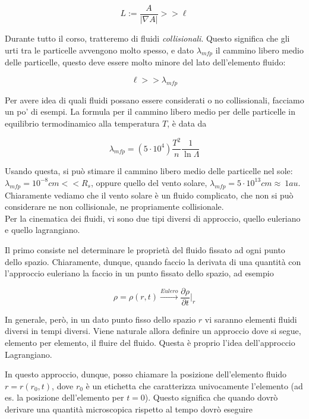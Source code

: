 \documentclass{report}
\begin{document}
\begin{equation}
    L := \frac{A}{|\nabla A|} >> \ell 
\end{equation}

Durante tutto il corso, tratteremo di fluidi \emph{collisionali}. Questo significa che gli urti tra le particelle avvengono molto spesso, e dato $\lambda_{mfp}$ il cammino libero medio delle particelle, questo deve essere molto minore del lato dell'elemento fluido: 

\begin{equation}
    \ell >> \lambda_{mfp}
\end{equation}

Per avere idea di quali fluidi possano essere considerati o no collissionali, facciamo un po' di esempi. La formula per il cammino libero medio per delle particelle in equilibrio termodinamico alla temperatura $T$,  è data da 

\begin{equation}
    \lambda_{mfp} = (5 \cdot 10^4)\frac{T^2}{n}\frac{1}{\ln \Lambda}
\end{equation}

Usando questa, si può stimare il cammino libero medio delle particelle nel sole: $\lambda_{mfp} = 10^{-8}cm << R_s$, oppure quello del vento solare, $\lambda_{mfp} = 5 \cdot 10^{13}cm \approx  \ 1 au$. Chiaramente vediamo che il vento solare è un fluido complicato, che non si può considerare ne non collisionale, ne propriamente collisionale. \\

Per la cinematica dei fluidi, vi sono due tipi diversi di approccio, quello euleriano e quello lagrangiano. 

Il primo consiste nel determinare le proprietà del fluido fissato ad ogni punto dello spazio. Chiaramente, dunque, quando faccio la derivata di una quantità con l'approccio euleriano la faccio in un punto fissato dello spazio, ad esempio

\begin{equation}
    \rho = \rho(r, t) \xrightarrow{Eulero} \frac{\partial \rho}{\partial t}\biggr |_{r}
\end{equation}

In generale, però, in un dato punto fisso dello spazio $r$ vi saranno elementi fluidi diversi in tempi diversi. Viene naturale allora definire un approccio dove si segue, elemento per elemento, il fluire del fluido. Questa è proprio l'idea dell'approccio Lagrangiano. 

In questo approccio, dunque, posso chiamare la posizione dell'elemento fluido $r=r(r_0, t)$, dove $r_0$ è un etichetta che caratterizza univocamente l'elemento (ad es. la posizione dell'elemento per $t=0$). Questo significa che quando dovrò derivare una quantità microscopica rispetto al tempo dovrò eseguire 
\end{document}
